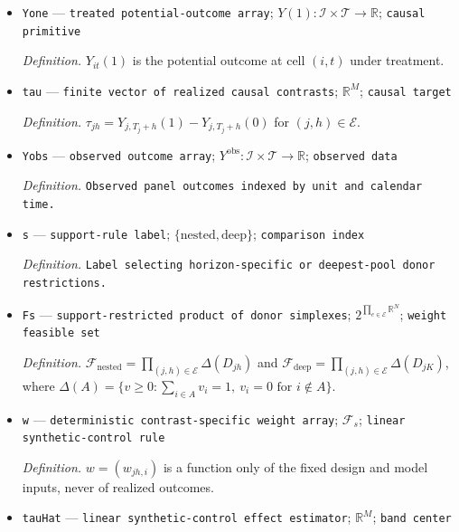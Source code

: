 \documentclass{article}
\begin{document}
\begin{itemize}
  \par\smallskip\noindent\emph{Definition.} \(Q=(Y_{it}(0))_{(i,t)\in\mathcal C}\), with each unit--calendar-time cell appearing once.
  \item \texttt{Yone} --- \texttt{treated potential-\allowbreak{}outcome array}; \(Y(1):\mathcal I\times\mathcal T\to\mathbb R\); \texttt{causal primitive}
  \par\smallskip\noindent\emph{Definition.} \(Y_{it}(1)\) is the potential outcome at cell \((i,t)\) under treatment.
  \item \texttt{tau} --- \texttt{finite vector of realized causal contrasts}; \(\mathbb R^M\); \texttt{causal target}
  \par\smallskip\noindent\emph{Definition.} \(\tau_{jh}=Y_{j,T_j+h}(1)-Y_{j,T_j+h}(0)\) for \((j,h)\in\mathcal E\).
  \item \texttt{Yobs} --- \texttt{observed outcome array}; \(Y^{\mathrm{obs}}:\mathcal I\times\mathcal T\to\mathbb R\); \texttt{observed data}
  \par\smallskip\noindent\emph{Definition.} \texttt{Observed panel outcomes indexed by unit and calendar time.}
  \item \texttt{s} --- \texttt{support-\allowbreak{}rule label}; \(\{\mathrm{nested},\mathrm{deep}\}\); \texttt{comparison index}
  \par\smallskip\noindent\emph{Definition.} \texttt{Label selecting horizon-\allowbreak{}specific or deepest-\allowbreak{}pool donor restrictions.}
  \item \texttt{Fs} --- \texttt{support-\allowbreak{}restricted product of donor simplexes}; \(2^{\prod_{e\in\mathcal E}\mathbb R^N}\); \texttt{weight feasible set}
  \par\smallskip\noindent\emph{Definition.} \(\mathcal F_{\mathrm{nested}}=\prod_{(j,h)\in\mathcal E}\Delta(D_{jh})\) and \(\mathcal F_{\mathrm{deep}}=\prod_{(j,h)\in\mathcal E}\Delta(D_{jK})\), where \(\Delta(A)=\{v\ge0:\sum_{i\in A}v_i=1,\ v_i=0\text{ for }i\notin A\}\).
  \item \texttt{w} --- \texttt{deterministic contrast-\allowbreak{}specific weight array}; \(\mathcal F_s\); \texttt{linear synthetic-\allowbreak{}control rule}
  \par\smallskip\noindent\emph{Definition.} \(w=(w_{jh,i})\) is a function only of the fixed design and model inputs, never of realized outcomes.
  \item \texttt{tauHat} --- \texttt{linear synthetic-\allowbreak{}control effect estimator}; \(\mathbb R^M\); \texttt{band center}

\end{itemize}
\end{document}

